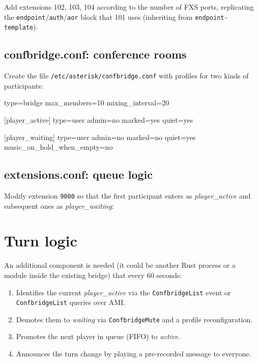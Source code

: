 Add extensions 102, 103, 104 according to the number of FXS ports, replicating the \texttt{endpoint}/\texttt{auth}/\texttt{aor} block that 101 uses (inheriting from \texttt{endpoint-template}).

\subsection{confbridge.conf: conference rooms}

Create the file \texttt{/etc/asterisk/confbridge.conf} with profiles for two kinds of participants:

\begin{astcode}
type=bridge
max_members=10
mixing_interval=20

[player_active]
type=user
admin=no
marked=yes
quiet=yes

[player_waiting]
type=user
admin=no
marked=no
quiet=yes
music_on_hold_when_empty=no
\end{astcode}

\subsection{extensions.conf: queue logic}

Modify extension \texttt{9000} so that the first participant enters as \emph{player\_active} and subsequent ones as \emph{player\_waiting}:


\section{Turn logic}

An additional component is needed (it could be another Rust process or a module inside the existing bridge) that every 60 seconds:

\begin{enumerate}
  \item Identifies the current \emph{player\_active} via the \texttt{ConfbridgeList} event or \texttt{ConfbridgeList} queries over AMI.
  \item Demotes them to \emph{waiting} via \texttt{ConfbridgeMute} and a profile reconfiguration.
  \item Promotes the next player in queue (FIFO) to \emph{active}.
  \item Announces the turn change by playing a pre-recorded message to everyone.
\end{enumerate}

